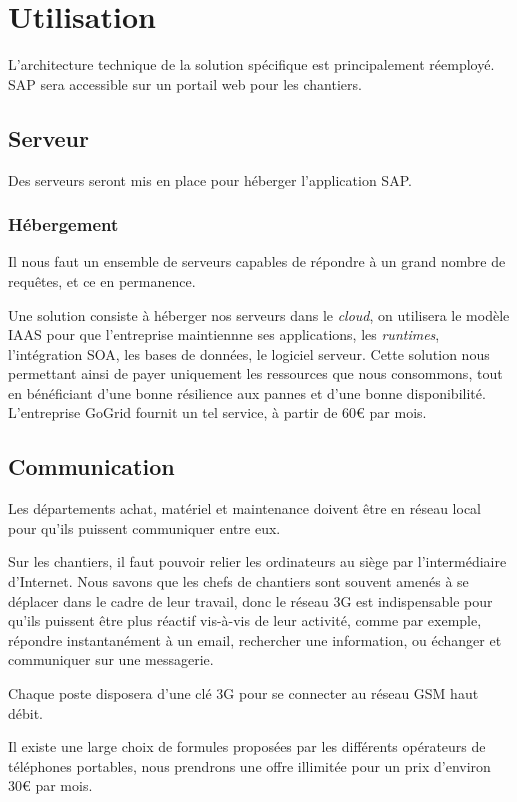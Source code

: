 \section{Utilisation}

L'architecture technique de la solution spécifique est principalement réemployé.
SAP sera accessible sur un portail web pour les chantiers.

\subsection{Serveur}

Des serveurs seront mis en place pour héberger l'application SAP.

	\subsubsection{Hébergement}
    Il nous faut un ensemble de serveurs capables de répondre à un grand
    nombre de requêtes, et ce en permanence.

Une solution consiste à héberger nos serveurs dans le \textsl{cloud}, on
utilisera le modèle IAAS pour  que l'entreprise maintiennne ses applications,
les {\sl runtimes}, l'intégration SOA, les bases de données, le logiciel
serveur.  Cette solution nous permettant ainsi de payer uniquement les
ressources que nous consommons, tout en bénéficiant d'une bonne résilience
aux pannes et d'une bonne disponibilité.  L'entreprise GoGrid fournit un
tel service, à partir de 60€ par mois.


\subsection{Communication}
Les départements achat, matériel et maintenance doivent être en réseau local
pour qu'ils puissent  communiquer entre eux.

Sur les chantiers, il faut pouvoir relier les ordinateurs au siège par
l'intermédiaire d'Internet.  Nous savons que les chefs de chantiers sont
souvent amenés à se déplacer dans le cadre de leur travail, donc le réseau
3G est indispensable pour qu'ils puissent être plus réactif vis-à-vis de
leur activité, comme par exemple, répondre instantanément à un email,
rechercher une information, ou échanger et communiquer sur une messagerie. 

Chaque poste disposera d’une clé 3G pour se connecter au réseau GSM haut
débit.

Il existe une large choix de formules proposées par les différents
opérateurs de téléphones portables, nous prendrons une offre illimitée pour un prix 
d'environ 30€ par mois.

